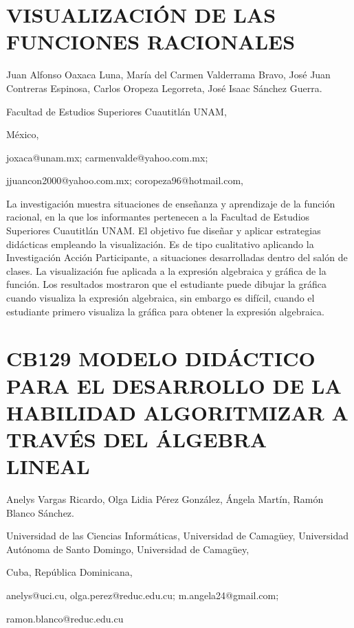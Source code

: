 \setcounter{section}{127}


\section{VISUALIZACIÓN DE LAS FUNCIONES RACIONALES}

\begin{datos}

Juan Alfonso Oaxaca Luna, María del Carmen Valderrama Bravo, José
Juan Contreras Espinosa, Carlos Oropeza Legorreta, José Isaac Sánchez
Guerra.

Facultad de Estudios Superiores Cuautitlán UNAM,

México,

joxaca@unam.mx; carmenvalde@yahoo.com.mx;

jjuancon2000@yahoo.com.mx; coropeza96@hotmail.com,

\end{datos}

La investigación muestra situaciones de enseñanza y aprendizaje de
la función racional, en la que los informantes pertenecen a la Facultad
de Estudios Superiores Cuautitlán UNAM. El objetivo fue diseñar y
aplicar estrategias didácticas empleando la visualización. Es de tipo
cualitativo aplicando la Investigación Acción Participante, a situaciones
desarrolladas dentro del salón de clases. La visualización fue aplicada
a la expresión algebraica y gráfica de la función. Los resultados
mostraron que el estudiante puede dibujar la gráfica cuando visualiza
la expresión algebraica, sin embargo es difícil, cuando el estudiante
primero visualiza la gráfica para obtener la expresión algebraica. 


\section{CB129 MODELO DIDÁCTICO PARA EL DESARROLLO DE LA HABILIDAD ALGORITMIZAR
A TRAVÉS DEL ÁLGEBRA LINEAL}

\begin{datos}

Anelys Vargas Ricardo, Olga Lidia Pérez González, Ángela Martín, Ramón
Blanco Sánchez.

Universidad de las Ciencias Informáticas, Universidad de Camagüey,
Universidad Autónoma de Santo Domingo, Universidad de Camagüey, 

Cuba, República Dominicana, 

anelys@uci.cu, olga.perez@reduc.edu.cu; m.angela24@gmail.com;

ramon.blanco@reduc.edu.cu

\end{datos}

